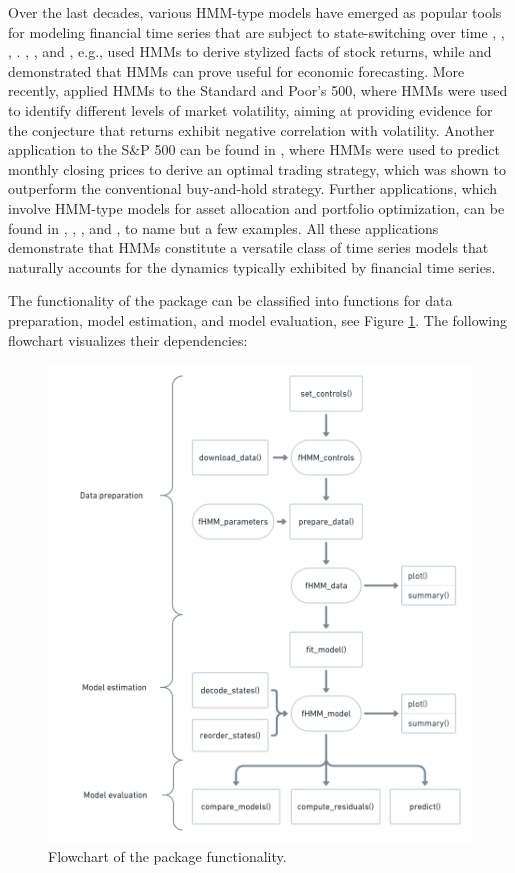 \documentclass[article]{jss}
\begin{document}
Over the last decades, various HMM-type models have emerged as popular tools for modeling financial time series that are subject to state-switching over time \cite{sch97}, \cite{dia09}, \cite{ang12}, \cite{dea17}. \cite{ryd98}, \cite{bul06}, and \cite{nys15a}, e.g., used HMMs to derive stylized facts of stock returns, while \cite{has05} and \cite{nys17} demonstrated that HMMs can prove useful for economic forecasting. More recently, \cite{lih17} applied HMMs to the Standard and Poor's 500, where HMMs were used to identify different levels of market volatility, aiming at providing evidence for the conjecture that returns exhibit negative correlation with volatility. Another application to the S\&P 500 can be found in \cite{ngu18}, where HMMs were used to predict monthly closing prices to derive an optimal trading strategy, which was shown to outperform the conventional buy-and-hold strategy. Further applications, which involve HMM-type models for asset allocation and portfolio optimization, can be found in \cite{ang02}, \cite{bul11}, \cite{nys15a}, and \cite{nys18}, to name but a few examples. All these applications demonstrate that HMMs constitute a versatile class of time series models that naturally accounts for the dynamics typically exhibited by financial time series.

The functionality of the  package can be classified into functions for data preparation, model estimation, and model evaluation, see Figure \ref{fig:flowchart}. The following flowchart visualizes their dependencies:

\begin{figure}
  \centering
  \includegraphics[scale = 0.5]{flowchart.png}
  \caption{Flowchart of the package functionality.}
  \label{fig:flowchart}
\end{figure}
\end{document}
